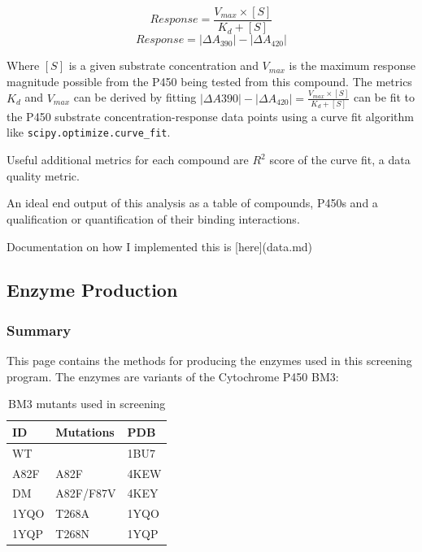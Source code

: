 \documentclass{article}
\begin{document}
\begin{enumerate}
\begin{enumerate}
\begin{enumerate}
		   $$ Response = \frac{V_{max} \times [S]}{K_{d} + [S]}$$
		   $$ Response = |\Delta A_{390}| - |\Delta A_{420}| $$

		   Where $[S]$ is a given substrate concentration and $V_{max}$ is the maximum response magnitude possible from the P450 being tested from this compound.
				The metrics $K_d$ and $V_{max}$ can be derived by fitting $|\Delta A{390}| - |\Delta A_{420}|= \frac{V_{max} \times [S]}{K_{d} + [S]}$ can be fit to the P450 substrate concentration-response  data points using a curve fit algorithm like \texttt{scipy.optimize.curve\_fit}.

		   Useful additional metrics for each compound are $R^2$ score of the curve fit, a data quality metric. 

		   An ideal end output of this analysis as a table of compounds, P450s and a qualification or quantification of their binding interactions.

		   Documentation on how I implemented this is [here](data.md)
		\end{enumerate}
   \end{enumerate}
\end{enumerate}

\subsection{Enzyme Production}

\subsubsection{Summary}

This page contains the methods for producing the enzymes used in this screening program.
The enzymes are variants of the Cytochrome P450 BM3:

\begin{table}
	\begin{center}
		\caption{BM3 mutants used in screening\label{bm3_table}}
		\begin{tabular}{l|p{3cm}|l}
		\textbf{ID} & \textbf{Mutations} & \textbf{PDB} \\
		\hline 
		WT   &           & 1BU7 \\
		A82F &   A82F    & 4KEW \\
		DM   & A82F/F87V & 4KEY \\
		1YQO &   T268A   & 1YQO \\
		1YQP &   T268N   & 1YQP \\
		\end{tabular}
	\end{center}
\end{table}
\end{document}
